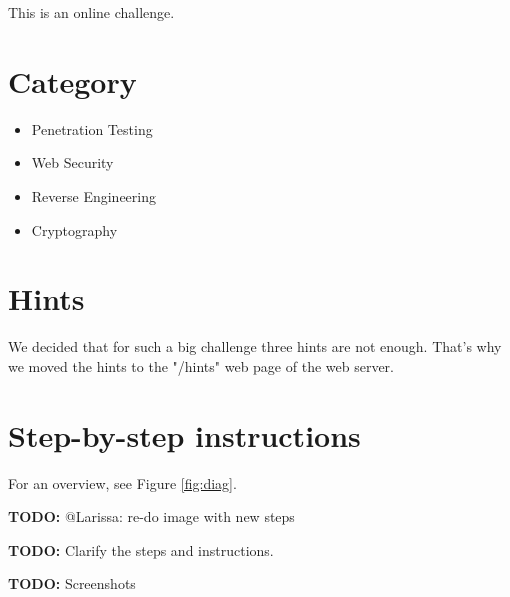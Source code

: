 \documentclass[a4paper]{article}
\newcommand{\TODO}[1]{\begin{center}\large\textbf{TODO:} #1\end{center}}
\begin{document}
This is an online challenge.

\section{Category}

\begin{itemize}
  \item Penetration Testing
  \item Web Security
  \item Reverse Engineering
  \item Cryptography
\end{itemize}

\section{Hints}

We decided that for such a big challenge three hints are not enough. That's
why we moved the hints to the "/hints" web page of the web server.

\section{Step-by-step instructions}

For an overview, see Figure \ref{fig:diag}.
\TODO{@Larissa: re-do image with new steps}

\TODO{Clarify the steps and instructions.}
\TODO{Screenshots}
\end{document}
